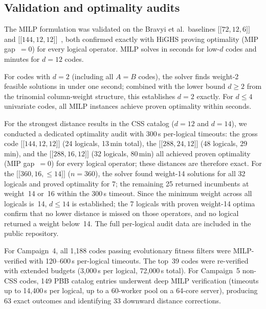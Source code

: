 \documentclass[aps,prxquantum,twocolumn,superscriptaddress,nofootinbib]{revtex4-2}
\newcommand{\dblbrk}[1]{\ensuremath{\lbrack\!\lbrack #1 \rbrack\!\rbrack}}
\newcommand{\code}[1]{\dblbrk{#1}}
\begin{document}
\subsection{Validation and optimality audits}

The MILP formulation was validated on the Bravyi et al.\ baselines $\code{72,12,6}$ and $\code{144,12,12}$~\cite{bravyi2024high}, both confirmed exactly with HiGHS proving optimality (MIP gap~$= 0$) for every logical operator.
MILP solves in seconds for low-$d$ codes and minutes for $d = 12$ codes.

For codes with $d = 2$ (including all $A = B$ codes), the solver finds weight-2 feasible solutions in under one second; combined with the lower bound $d \geq 2$ from the trinomial column-weight structure, this establishes $d = 2$ exactly.
For $d \leq 4$ univariate codes, all MILP instances achieve proven optimality within seconds.

For the strongest distance results in the CSS catalog ($d = 12$ and $d = 14$), we conducted a dedicated optimality audit with 300\,s per-logical timeouts:
the gross code $\code{144,12,12}$ (24 logicals, 13\,min total),
the $\code{288,24,12}$ (48 logicals, 29\,min),
and the $\code{288,16,12}$ (32 logicals, 80\,min) all achieved proven optimality (MIP gap~$= 0$) for every logical operator; these distances are therefore exact.
For the $\code{360,16,{\leq}14}$ ($n = 360$), the solver found weight-14 solutions for all 32 logicals and proved optimality for 7; the remaining 25 returned incumbents at weight~14 or~16 within the 300\,s timeout.
Since the minimum weight across all logicals is~14, $d \leq 14$ is established; the 7 logicals with proven weight-14 optima confirm that no lower distance is missed on those operators, and no logical returned a weight below~14.
The full per-logical audit data are included in the public repository.

For Campaign~4, all 1{,}188 codes passing evolutionary fitness filters were MILP-verified with 120--600\,s per-logical timeouts.
The top~39 codes were re-verified with extended budgets (3{,}000\,s per logical, 72{,}000\,s total).
For Campaign~5 non-CSS codes, 149 PBB catalog entries underwent deep MILP verification (timeouts up to 14{,}400\,s per logical, up to a 60-worker pool on a 64-core server), producing 63 exact outcomes and identifying 33 downward distance corrections.


\end{document}
